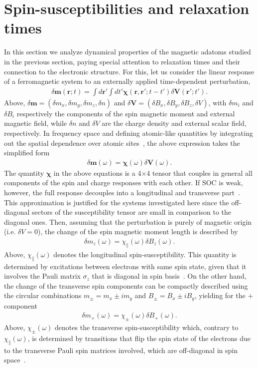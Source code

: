 \documentclass[prb,footinbib,showpacs,twocolumn,amsmath,amssymb]{revtex4}
\newcommand{\bek}{\begin{eqnarray}}
\newcommand{\ek}{\end{eqnarray}}
\begin{document}
\section{Spin-susceptibilities and relaxation times}
\label{sec:lifetimes}

In this section we analyze  dynamical properties of the magnetic 
adatoms studied in the previous section,
paying special attention to  relaxation times and their connection to 
the electronic structure. For this, let us consider the linear response of a ferromagnetic
system to an externally applied time-dependent perturbation,
\bek\label{eq:general-response}
\delta {\textbf{m}}(\textbf{r};t)=
\int d\textbf{r}'\int dt'
\boldsymbol{\chi}(\textbf{r},\textbf{r}';t-t')\delta {\textbf{V}}(\textbf{r}';t').
\ek
Above, $\delta{\textbf{m}}=(\delta m_{x},\delta m_{y},\delta m_{z},\delta n)$ and 
$\delta{\textbf{V}}=(\delta B_{x},\delta B_{y},\delta B_{z},\delta V)$, with 
$\delta m_{i}$ and $\delta B_{i}$ respectively 
the components of the spin magnetic moment and external magnetic field, while
$\delta n$ and $\delta V$ are the charge density and external scalar field, respectively. 
In frequency space and defining atomic-like quantities by integrating 
out the spatial dependence over atomic sites~\cite{lounis_theory_2011}, the above expression
takes the simplified form
\bek\label{eq:general-response-w}
\delta {\textbf{m}}(\omega)=
\boldsymbol{\chi}(\omega)\delta {\textbf{V}}(\omega).
\ek
The quantity $\boldsymbol{\chi}$ in the above equations is a 4$\times$4
tensor that couples in general all components of the spin and charge responses
with each other.
If SOC is weak, however,
the full response decouples into a longitudinal and transverse
part~\cite{book_vignale}. 
This approximation is justified for the systems investigated here since the 
off-diagonal sectors of the susceptibility tensor are small in comparison to the diagonal ones.
Then, assuming that the perturbation is purely of
magnetic origin (i.e. $\delta V=0$), 
the change of the spin magnetic moment length
is described by
\bek\label{eq:dmz-w}
\delta m_{z}(\omega)=
\chi_{\parallel}(\omega)\delta B_{z}(\omega).
\ek
Above, $\chi_{\parallel}(\omega)$ 
denotes the longitudinal spin-susceptibility.
This quantity is determined by excitations between electrons with same spin state,
given that it involves the Pauli matrix $\sigma_{z}$ that is
diagonal in spin basis~\cite{PhysRevLett.119.017203}.
On the other hand, the change of the transverse spin components 
can be compactly described using the circular combinations $m_{\pm}=m_{x}\pm im_{y}$ and 
$B_{\pm}=B_{x}\pm iB_{y}$, yielding for the $+$ component
\bek\label{eq:dm+_w}
\delta m_{+}(\omega)=
\chi_{\pm}(\omega)\delta B_{+}(\omega).
\ek
Above, $\chi_{\pm}(\omega)$ denotes the transverse spin-susceptibility which, contrary to 
$\chi_{\parallel}(\omega)$, is determined by transitions that flip the spin state of the electrons
due to the transverse Pauli spin matrices involved, 
which are off-diagonal in spin space~\cite{lounis_dynamical_2010,lounis_theory_2011,dias_relativistic_2015}. 
\end{document}
